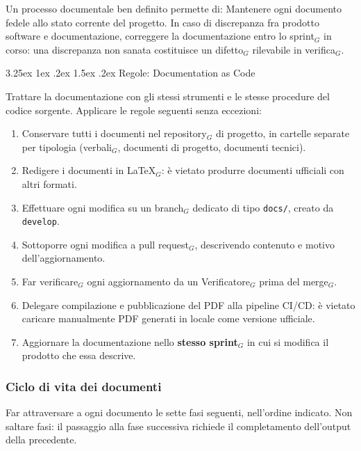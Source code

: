 \documentclass[a4paper, 10pt]{article}
\makeatletter
\renewcommand\paragraph{\@startsection{paragraph}{4}{\z@}%
  {3.25ex \@plus1ex \@minus .2ex}%
  {1.5ex \@plus .2ex}%
  {\normalfont\normalsize\bfseries}}
\makeatother
\begin{document}
Un processo documentale ben definito permette di:
\noindent Mantenere ogni documento fedele allo stato corrente del progetto. In caso di discrepanza fra prodotto software e documentazione, correggere la documentazione entro lo sprint$_G$ in corso: una discrepanza non sanata costituisce un difetto$_G$ rilevabile in verifica$_G$.

\paragraph{Regole: Documentation as Code}

Trattare la documentazione con gli stessi strumenti e le stesse procedure del codice sorgente. Applicare le regole seguenti senza eccezioni:

\begin{enumerate}
    \item Conservare tutti i documenti nel repository$_G$ di progetto, in cartelle separate per tipologia (verbali$_G$, documenti di progetto, documenti tecnici).
    \item Redigere i documenti in \LaTeX$_G$: è vietato produrre documenti ufficiali con altri formati.
    \item Effettuare ogni modifica su un branch$_G$ dedicato di tipo \texttt{docs/}, creato da \texttt{develop}.
    \item Sottoporre ogni modifica a pull request$_G$, descrivendo contenuto e motivo dell'aggiornamento.
    \item Far verificare$_G$ ogni aggiornamento da un Verificatore$_G$ prima del merge$_G$.
    \item Delegare compilazione e pubblicazione del PDF alla pipeline CI/CD: è vietato caricare manualmente PDF generati in locale come versione ufficiale.
    \item Aggiornare la documentazione nello \textbf{stesso sprint$_G$} in cui si modifica il prodotto che essa descrive.
\end{enumerate}

\subsubsection{Ciclo di vita dei documenti}
\label{subsec:ciclo_vita_documenti}

Far attraversare a ogni documento le sette fasi seguenti, nell'ordine indicato. Non saltare fasi: il passaggio alla fase successiva richiede il completamento dell'output della precedente.
\end{document}
